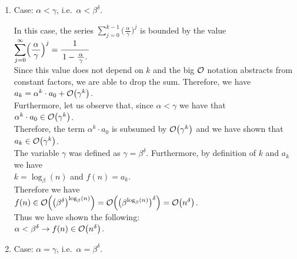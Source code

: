 \begin{enumerate}
\item Case: $\alpha < \gamma$, i.e.~$\alpha < \beta^\delta$.

      In this case, the series $\sum\limits_{j=0}^{k-1} \bigl(\frac{\,\alpha\,}{\gamma}\bigr)^j$ is bounded 
      by the value
      \\[0.2cm]
      \hspace*{1.3cm}
      $\displaystyle \sum\limits_{j=0}^{\infty} \Bigl(\frac{\,\alpha\,}{\gamma}\Bigr)^j = \bruch{1}{1 - \frac{\,\alpha\,}{\gamma}.}$
      \\[0.2cm]
      Since this value does not depend on $k$ and the big $\mathcal{O}$ notation abstracts from constant factors,
      we are able to drop the sum.  Therefore, we have
      \\[0.2cm]
      \hspace*{1.3cm}
      $a_k = \alpha^k \cdot a_0 + \mathcal{O}\bigl(\gamma^k\bigr)$.
      \\[0.2cm] 
      Furthermore, let us observe that, since $\alpha < \gamma$ we have that 
      \\[0.2cm]
      \hspace*{1.3cm}
      $\alpha^k \cdot a_0 \in \mathcal{O}\bigl(\gamma^k\bigr)$.
      \\[0.2cm]
      Therefore, the term $\alpha^k \cdot a_0$ is subsumed by $\mathcal{O}\bigl(\gamma^k\bigr)$ and we have shown that
      \\[0.2cm]
      \hspace*{1.3cm}
      $a_k \in \mathcal{O}\bigl(\gamma^k\bigr)$.
      \\[0.2cm]
      The variable $\gamma$ was defined as $\gamma = \beta^\delta$.  Furthermore, by definition of $k$ and $a_k$
      we have 
      \\[0.2cm]
      \hspace*{1.3cm}
      $k = \log_{\beta}(n)$ \quad and \quad $f(n) = a_k$.  
      \\[0.2cm]
      Therefore we have 
      \\[0.2cm]
      \hspace*{1.3cm}
      $f(n) \in \mathcal{O}\Bigl(\bigl(\beta^\delta\bigr)^{\log_{\beta}(n)}\Bigr) = \mathcal{O}\Bigl(\bigl(\beta^{\log_{\beta}(n)}\bigr)^\delta\Bigr) = \mathcal{O}\bigl(n^\delta\bigr)$.
      \\[0.2cm] 
      Thus we have shown the following:
      \\[0.2cm]
      \hspace*{1.3cm}
      $\alpha < \beta^\delta \rightarrow f(n) \in \mathcal{O}\bigl(n^\delta\bigr)$.
\item Case: $\alpha = \gamma$, i.e.~$\alpha = \beta^\delta$.


\end{enumerate}
